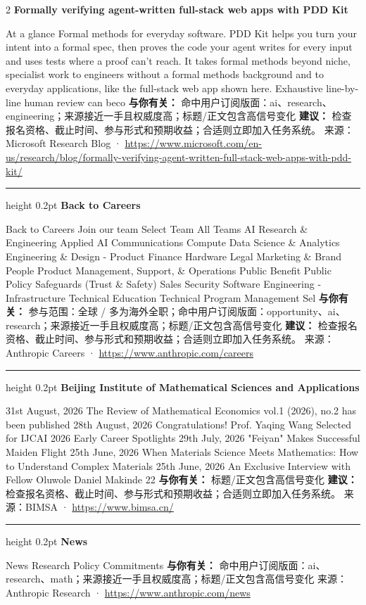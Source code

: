 \documentclass[10.5pt]{ctexart}
\begin{document}
\begin{multicols}{2}
{\large\bfseries Formally verifying agent-written full-stack web apps with PDD Kit}\par
At a glance Formal methods for everyday software. PDD Kit helps you turn your intent into a formal spec, then proves the code your agent writes for every input and uses tests where a proof can’t reach. It takes formal methods beyond niche, specialist work to engineers without a formal methods background and to everyday applications, like the full-stack web app shown here. Exhaustive line-by-line human review can beco
\textbf{与你有关：} 命中用户订阅版面：ai、research、engineering；来源接近一手且权威度高；标题/正文包含高信号变化
\textbf{建议：} 检查报名资格、截止时间、参与形式和预期收益；合适则立即加入任务系统。
{\footnotesize\color{ormuted} 来源：Microsoft Research Blog · \url{https://www.microsoft.com/en-us/research/blog/formally-verifying-agent-written-full-stack-web-apps-with-pdd-kit/}}
\vspace{2mm}
\hrule height 0.2pt
\vspace{2mm}
{\large\bfseries Back to Careers}\par
Back to Careers Join our team Select Team All Teams AI Research \& Engineering Applied AI Communications Compute Data Science \& Analytics Engineering \& Design - Product Finance Hardware Legal Marketing \& Brand People Product Management, Support, \& Operations Public Benefit Public Policy Safeguards (Trust \& Safety) Sales Security Software Engineering - Infrastructure Technical Education Technical Program Management Sel
\textbf{与你有关：} 参与范围：全球 / 多为海外全职；命中用户订阅版面：opportunity、ai、research；来源接近一手且权威度高；标题/正文包含高信号变化
\textbf{建议：} 检查报名资格、截止时间、参与形式和预期收益；合适则立即加入任务系统。
{\footnotesize\color{ormuted} 来源：Anthropic Careers · \url{https://www.anthropic.com/careers}}
\vspace{2mm}
\hrule height 0.2pt
\vspace{2mm}
{\large\bfseries Beijing Institute of Mathematical Sciences and Applications}\par
31st August, 2026 The Review of Mathematical Economics vol.1 (2026), no.2 has been published 28th August, 2026 Congratulations! Prof. Yaqing Wang Selected for IJCAI 2026 Early Career Spotlights 29th July, 2026 "Feiyan" Makes Successful Maiden Flight 25th June, 2026 When Materials Science Meets Mathematics: How to Understand Complex Materials 25th June, 2026 An Exclusive Interview with Fellow Oluwole Daniel Makinde 22
\textbf{与你有关：} 标题/正文包含高信号变化
\textbf{建议：} 检查报名资格、截止时间、参与形式和预期收益；合适则立即加入任务系统。
{\footnotesize\color{ormuted} 来源：BIMSA · \url{https://www.bimsa.cn/}}
\vspace{2mm}
\hrule height 0.2pt
\vspace{2mm}
{\large\bfseries News}\par
News Research Policy Commitments
\textbf{与你有关：} 命中用户订阅版面：ai、research、math；来源接近一手且权威度高；标题/正文包含高信号变化
{\footnotesize\color{ormuted} 来源：Anthropic Research · \url{https://www.anthropic.com/news}}
\end{multicols}
\end{document}
